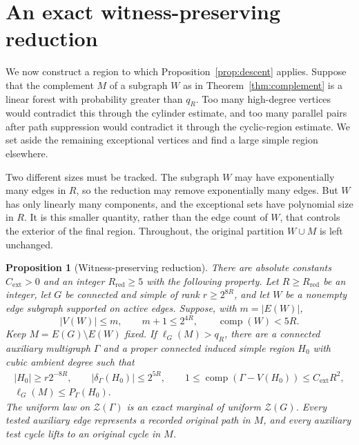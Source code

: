 \documentclass[11pt,a4paper]{article}
\numberwithin{equation}{section}
\newtheorem{proposition}[theorem]{Proposition}
\theoremstyle{definition}
\theoremstyle{remark}
\newcommand{\cZ}{\mathcal Z}
\newcommand{\cc}{\operatorname{comp}}
\begin{document}
\section{An exact witness-preserving reduction}\label{sec:cleanup}
We now construct a region to which Proposition~\ref{prop:descent} applies. Suppose that the complement $M$ of a subgraph $W$ as in Theorem~\ref{thm:complement} is a linear forest with probability greater than $q_R$. Too many high-degree vertices would contradict this through the cylinder estimate, and too many parallel pairs after path suppression would contradict it through the cyclic-region estimate. We set aside the remaining exceptional vertices and find a large simple region elsewhere.

Two different sizes must be tracked. The subgraph $W$ may have exponentially many edges in $R$, so the reduction may remove exponentially many edges. But $W$ has only linearly many components, and the exceptional sets have polynomial size in $R$. It is this smaller quantity, rather than the edge count of $W$, that controls the exterior of the final region. Throughout, the original partition $W\cup M$ is left unchanged.

\begin{proposition}[Witness-preserving reduction]\label{prop:cleanup}
There are absolute constants $C_{\mathrm{ext}}>0$ and an integer $R_{\mathrm{red}}\ge5$ with the following property. Let $R\ge R_{\mathrm{red}}$ be an integer, let $G$ be connected and simple of rank $r\ge2^{8R}$, and let $W$ be a nonempty edge subgraph supported on active edges. Suppose, with $m=|E(W)|$,
\begin{equation}\label{eq:cleanup-hypotheses}
 |V(W)|\le m,
 \qquad m+1\le2^{4R},\qquad \cc(W)<5R.
\end{equation}
Keep $M=E(G)\setminus E(W)$ fixed. If $\ell_G(M)>q_R$, there are a connected auxiliary multigraph $\Gamma$ and a proper connected induced simple region $H_0$ with cubic ambient degree such that
\begin{equation}\label{eq:cleanup-output}
 \begin{gathered}
 |H_0|\ge r2^{-8R},\qquad |\delta_\Gamma(H_0)|\le2^{5R},\qquad
 1\le\cc(\Gamma-V(H_0))\le C_{\mathrm{ext}}R^2,\\
 \ell_G(M)\le P_\Gamma(H_0).
 \end{gathered}
\end{equation}
The uniform law on $\cZ(\Gamma)$ is an exact marginal of uniform $\cZ(G)$. Every tested auxiliary edge represents a recorded original path in $M$, and every auxiliary test cycle lifts to an original cycle in $M$.
\end{proposition}
\end{document}
